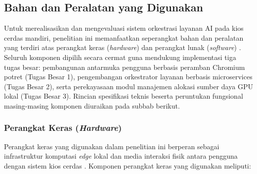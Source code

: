 
\subsection{Bahan dan Peralatan yang Digunakan}
\label{subsec:bahan_dan_peralatan}

Untuk merealisasikan dan mengevaluasi sistem orkestrasi layanan AI pada kios cerdas mandiri, penelitian ini memanfaatkan seperangkat bahan dan peralatan yang terdiri atas perangkat keras (\textit{hardware}) dan perangkat lunak (\textit{software}) \cite{chen2022minideep}. Seluruh komponen dipilih secara cermat guna mendukung implementasi tiga tugas besar: pembangunan antarmuka pengguna berbasis peramban Chromium potret (Tugas Besar 1), pengembangan orkestrator layanan berbasis microservices (Tugas Besar 2), serta perekayasaan modul manajemen alokasi sumber daya GPU lokal (Tugas Besar 3). Rincian spesifikasi teknis beserta peruntukan fungsional masing-masing komponen diuraikan pada subbab berikut.

\subsubsection{Perangkat Keras (\textit{Hardware})}
\label{subsubsec:hardware}

Perangkat keras yang digunakan dalam penelitian ini berperan sebagai infrastruktur komputasi \textit{edge} lokal dan media interaksi fisik antara pengguna dengan sistem kios cerdas \cite{chen2022minideep, chiang2023management}. Komponen perangkat keras yang digunakan meliputi:

